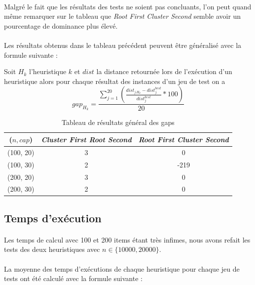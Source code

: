 \documentclass[twoside,UTF8]{EPURapport}
\begin{document}
\paragraph{}
Malgré le fait que les résultats des tests ne soient pas concluants, l'on peut quand même remarquer sur le tableau que \textit{Root First Cluster Second} semble avoir un  pourcentage de dominance plus élevé.

\paragraph{}
Les résultats obtenus dans le tableau précédent peuvent être généralisé avec la formule suivante : 


Soit $H_{k}$ l'heuristique $k$ et $dist$ la distance retournée lors de l'exécution d'un heuristique alors pour chaque résultat des instances d'un jeu de test on a $$ gap_{H_{k}} =  \frac{\displaystyle\sum_{j=1}^{20}(\frac{dist_{j\, H_{k}} - dist_{j}^{best}}{dist_{j}^{best}} * 100)}{20}$$


\begin{table}[H]
\centering
\begin{tabular}{|c|c|c|}
\hline 
($n,cap$) & \textit{Cluster First Root Second} & \textit{Root First Cluster Second} \\ 
\hline 
(100, 20) & 3 & 0 \\ 
\hline 
(100, 30) & 2 & -219 \\
\hline 
(200, 20) & 3 & 0 \\ 
\hline 
(200, 30) & 2 & 0 \\ 
\hline 
\end{tabular}
\caption{Tableau de résultats général des gaps} 
\end{table}

\subsection{Temps d'exécution}

\paragraph{}
Les temps de calcul avec 100 et 200 items étant très infimes, nous avons refait les tests des deux heuristiques avec $n \in \{10000, 20000\}$. 

\paragraph{}
La moyenne des temps d'exécutions de chaque heuristique pour chaque jeu de tests ont été calculé avec la formule suivante : 
\end{document}
